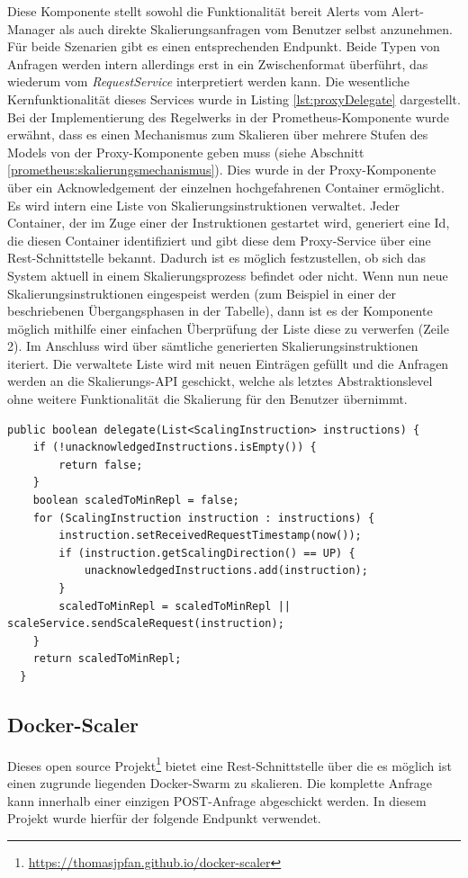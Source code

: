 Diese Komponente stellt sowohl die Funktionalität bereit Alerts vom Alert-Manager als auch direkte Skalierungsanfragen vom Benutzer selbst anzunehmen. Für beide Szenarien gibt es einen entsprechenden Endpunkt. Beide Typen von Anfragen werden intern allerdings erst in ein Zwischenformat überführt, das wiederum vom \emph{RequestService} interpretiert werden kann. Die wesentliche Kernfunktionalität dieses Services wurde in Listing \ref{lst:proxyDelegate} dargestellt. Bei der Implementierung des Regelwerks in der Prometheus-Komponente wurde erwähnt, dass es einen Mechanismus zum Skalieren über mehrere Stufen des Models von der Proxy-Komponente geben muss (siehe Abschnitt \ref{prometheus:skalierungsmechanismus}). Dies wurde in der Proxy-Komponente über ein Acknowledgement der einzelnen hochgefahrenen Container ermöglicht. Es wird intern eine Liste von Skalierungsinstruktionen verwaltet. Jeder Container, der im Zuge einer der Instruktionen gestartet wird, generiert eine Id, die diesen Container identifiziert und gibt diese dem Proxy-Service über eine Rest-Schnittstelle bekannt. Dadurch ist es möglich festzustellen, ob sich das System aktuell in einem Skalierungsprozess befindet oder nicht. Wenn nun neue Skalierungsinstruktionen eingespeist werden (zum Beispiel in einer der beschriebenen Übergangsphasen in der Tabelle), dann ist es der Komponente möglich mithilfe einer einfachen Überprüfung der Liste diese zu verwerfen (Zeile 2). Im Anschluss wird über sämtliche generierten Skalierungsinstruktionen iteriert. Die verwaltete Liste wird mit neuen Einträgen gefüllt und die Anfragen werden an die Skalierungs-API geschickt, welche als letztes Abstraktionslevel ohne weitere Funktionalität die Skalierung für den Benutzer übernimmt. 

\begin{lstlisting}[style=javaStyle,caption={Proxy Scaler - RequestService},label=lst:proxyDelegate]
  public boolean delegate(List<ScalingInstruction> instructions) {
    if (!unacknowledgedInstructions.isEmpty()) {
        return false;
    }
    boolean scaledToMinRepl = false;
    for (ScalingInstruction instruction : instructions) {
        instruction.setReceivedRequestTimestamp(now());
        if (instruction.getScalingDirection() == UP) {
            unacknowledgedInstructions.add(instruction);
        }
        scaledToMinRepl = scaledToMinRepl || scaleService.sendScaleRequest(instruction);
    }
    return scaledToMinRepl;
  }
\end{lstlisting}


\subsection{Docker-Scaler}
Dieses open source Projekt\footnote{\url{https://thomasjpfan.github.io/docker-scaler}} bietet eine Rest-Schnittstelle über die es möglich ist einen zugrunde liegenden Docker-Swarm zu skalieren. Die komplette Anfrage kann innerhalb einer einzigen POST-Anfrage abgeschickt werden. In diesem Projekt wurde hierfür der folgende Endpunkt verwendet.

